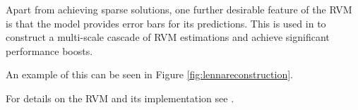 Apart from achieving sparse solutions, one further desirable feature of the RVM is that the model provides error bars for its predictions.
This is used in \cite{pilikos2014} to construct a multi-scale cascade of RVM estimations and achieve significant performance boosts.

An example of this can be seen in Figure \ref{fig:lennareconstruction}.

For details on the RVM and its implementation see \cite{pilikos2014,tipping2003,tipping2001}.

